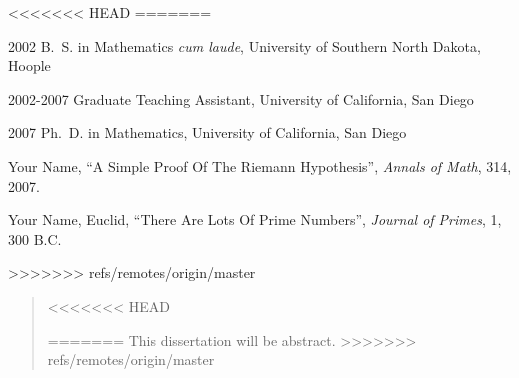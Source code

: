 \begin{frontmatter}
%
%
<<<<<<< HEAD
=======
\begin{vitapage}
\begin{vita}
  \item[2002] B.~S. in Mathematics \emph{cum laude}, University of Southern North Dakota, Hoople
  \item[2002-2007] Graduate Teaching Assistant, University of California, San Diego
  \item[2007] Ph.~D. in Mathematics, University of California, San Diego
\end{vita}
\begin{publications}
  \item Your Name, ``A Simple Proof Of The Riemann Hypothesis'', \emph{Annals of Math}, 314, 2007.
  \item Your Name, Euclid, ``There Are Lots Of Prime Numbers'', \emph{Journal of Primes}, 1, 300 B.C.
\end{publications}
\end{vitapage}
>>>>>>> refs/remotes/origin/master


%
%
\begin{abstract}
<<<<<<< HEAD
  
=======
  This dissertation will be abstract.
>>>>>>> refs/remotes/origin/master
\end{abstract}


\end{frontmatter}
